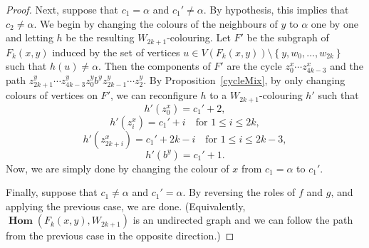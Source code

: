 \documentclass[11 pt]{amsart}
\theoremstyle{definition}
\theoremstyle{case}
\numberwithin{equation}{section}
\newcommand{\bHom}{\operatorname{\mathbf{Hom}}}
\begin{document}
\begin{proof}
Next, suppose that $c_1=\alpha$ and $c_1'\neq \alpha$. By hypothesis, this implies that $c_2\neq\alpha$. We begin by changing the colours of the neighbours of $y$ to $\alpha$ one by one and letting $h$ be the resulting $W_{2k+1}$-colouring. Let $F'$ be the subgraph of $F_{k}(x,y)$ induced by the set of vertices $u\in V(F_k(x,y))\setminus\left\{y,w_0,\dots,w_{2k}\right\}$ such that $h(u)\neq\alpha$. Then the components of $F'$ are the cycle $z_0^x\cdots z_{4k-3}^x$ and the path $z^y_{2k+1}\cdots z_{4k-3}^yz_0^y b^y z_{2k-1}^y\cdots z_2^y$. By Proposition~\ref{cycleMix}, by only changing colours of vertices on $F'$, we can reconfigure $h$ to a $W_{2k+1}$-colouring $h'$ such that 
\[h'(z_0^x) = c_1'+2,\]
\[h'\left(z_i^x\right) = c_1'+i\quad \text{for }1\leq i\leq 2k,\]
\[h'\left(z_{2k+i}^x\right) = c_1'+2k-i\quad \text{for }1\leq i\leq 2k-3,\]
\[h'(b^y)=c_1'+1.\]
Now, we are simply done by changing the colour of $x$ from $c_1=\alpha$ to $c_1'$. 

Finally, suppose that $c_1\neq \alpha$ and $c_1'=\alpha$. By reversing the roles of $f$ and $g$, and applying the previous case,
we are done.  (Equivalently, $\bHom(F_k(x,y),W_{2k+1})$ is an undirected graph and we can follow the path from the previous case in the opposite direction.)
\end{proof}
\end{document}
